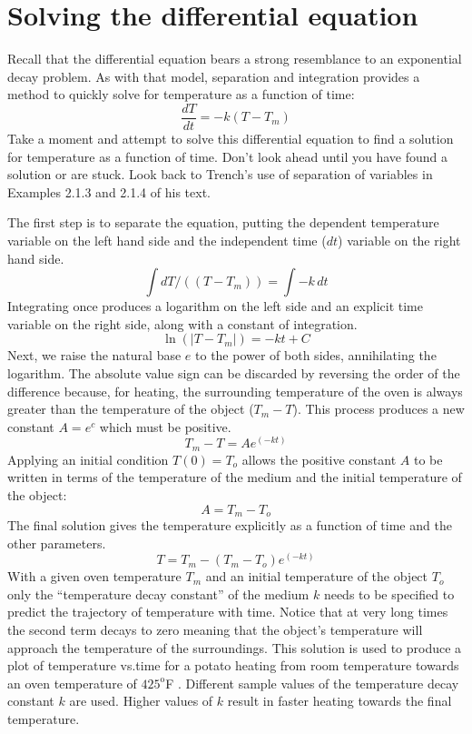 \documentclass{ximera}
\begin{document}
\section*{Solving the differential equation}

Recall that the differential equation bears a strong resemblance to an exponential decay problem.  As with that model, separation and integration provides a method to quickly solve for temperature as a function of time:
\[
\frac{dT}{dt}=-k(T-T_m)
\]
Take a moment and attempt to solve this differential equation to find a solution for temperature as a function of time.  Don't look ahead until you have found a solution or are stuck.  Look back to Trench's use of separation of variables in Examples 2.1.3 and 2.1.4 of his text.
   
The first step is to separate the equation, putting the dependent temperature variable on the left hand side and the independent time ($dt$) variable on the right hand side.
\[
\int dT/((T-T_m))=\int-k\,dt
\]
Integrating once produces a logarithm on the left side and an explicit time variable on the right side, along with a constant of integration.
\[
\ln(|T-T_m |)=-kt+C
\]
Next, we raise the natural base $e$ to the power of both sides, annihilating the logarithm.  The absolute value sign can be discarded by reversing the order of the difference because, for heating, the surrounding temperature of the oven is always greater than the temperature of the object ($T_m-T$).  This process produces a new constant $A=e^c$ which must be positive.
\[
T_m-T=Ae^(-kt)
\]
Applying an initial condition $T(0)=T_o$ allows the positive constant $A$ to be written in terms of the temperature of the medium and the initial temperature of the object:
\[
A=T_m-T_o
\]
The final solution gives the temperature explicitly as a function of time and the other parameters.
\[
T=T_m-(T_m-T_o ) e^(-kt)
\]
With a given oven temperature $T_m$ and an initial temperature of the object $T_o$ only the ``temperature decay constant'' of the medium $k$ needs to be specified to predict the trajectory of temperature with time.  Notice that at very long times the second term decays to zero meaning that the object's temperature will approach the temperature of the surroundings.
This solution is used to produce a plot of temperature vs.time for a potato heating from room temperature towards an oven temperature of $425^{\text{o}}$F .  Different sample values of the temperature decay constant $k$ are used.  Higher values of $k$ result in faster heating towards the final temperature.
 
\end{document}
